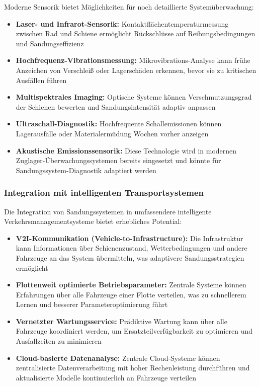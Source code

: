 \documentclass[a4paper,12pt]{article}
\theoremstyle{definition}
\begin{document}
Moderne Sensorik bietet Möglichkeiten für noch detaillierte Systemüberwachung:

\begin{itemize}
	\item \textbf{Laser- und Infrarot-Sensorik:} Kontaktflächentemperaturmessung zwischen Rad und Schiene ermöglicht Rückschlüsse auf Reibungsbedingungen und Sandungseffizienz
	\item \textbf{Hochfrequenz-Vibrationsmessung:} Mikrovibrations-Analyse kann frühe Anzeichen von Verschleiß oder Lagerschäden erkennen, bevor sie zu kritischen Ausfällen führen
	\item \textbf{Multispektrales Imaging:} Optische Systeme können Verschmutzungsgrad der Schienen bewerten und Sandungsintensität adaptiv anpassen
	\item \textbf{Ultraschall-Diagnostik:} Hochfrequente Schallemissionen können Lagerausfälle oder Materialermüdung Wochen vorher anzeigen
	\item \textbf{Akustische Emissionssensorik:} Diese Technologie wird in modernen Zuglager-Überwachungssystemen bereits eingesetzt und könnte für Sandungssystem-Diagnostik adaptiert werden
\end{itemize}

\subsubsection{Integration mit intelligenten Transportsystemen}

Die Integration von Sandungssystemen in umfassendere intelligente Verkehrsmanagementsysteme bietet erhebliches Potential:

\begin{itemize}
	\item \textbf{V2I-Kommunikation (Vehicle-to-Infrastructure):} Die Infrastruktur kann Informationen über Schienenzustand, Wetterbedingungen und andere Fahrzeuge an das System übermitteln, was adaptivere Sandungsstrategien ermöglicht
	\item \textbf{Flottenweit optimierte Betriebsparameter:} Zentrale Systeme können Erfahrungen über alle Fahrzeuge einer Flotte verteilen, was zu schnellerem Lernen und besserer Parameteroptimierung führt
	\item \textbf{Vernetzter Wartungsservice:} Prädiktive Wartung kann über alle Fahrzeuge koordiniert werden, um Ersatzteilverfügbarkeit zu optimieren und Ausfallzeiten zu minimieren
	\item \textbf{Cloud-basierte Datenanalyse:} Zentrale Cloud-Systeme können zentralisierte Datenverarbeitung mit hoher Rechenleistung durchführen und aktualisierte Modelle kontinuierlich an Fahrzeuge verteilen
\end{itemize}
\end{document}
